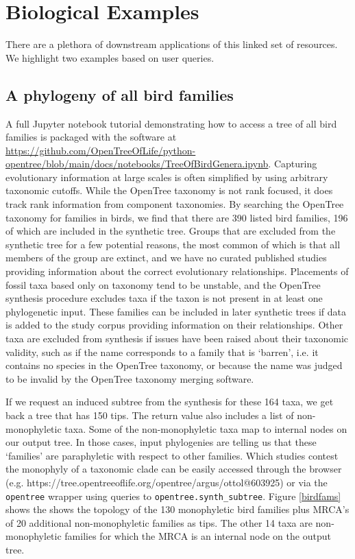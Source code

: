 \documentclass[oupdraft]{sysbio_sse}
\begin{document}
\bigskip

\section{Biological Examples}
\label{sec4}

There are a plethora of downstream applications of this linked set of resources.
We highlight two examples based on user queries.


\subsection{A phylogeny of all bird families}
A full Jupyter notebook tutorial demonstrating how to access a tree of all bird families is packaged with the software at \url{https://github.com/OpenTreeOfLife/python-opentree/blob/main/docs/notebooks/TreeOfBirdGenera.ipynb}.
Capturing evolutionary information at large scales is often simplified by using arbitrary taxonomic cutoffs.
While the OpenTree taxonomy is not rank focused, it does track rank information from component taxonomies.
By searching the OpenTree taxonomy for families in birds, we find that there are 390 listed bird families, 196 of which are included in the synthetic tree.
Groups that are excluded from the synthetic tree for a few potential reasons, the most common of which is that all members of the group are extinct, and we have no curated published studies providing information about the correct evolutionary relationships.
Placements of fossil taxa based only on taxonomy tend to be unstable, and the OpenTree synthesis procedure excludes taxa if the taxon is not present in at least one  phylogenetic input.
These families can be included in later synthetic trees if data is added to the study corpus providing information on their relationships.
Other taxa are excluded from synthesis if issues have been raised about their taxonomic validity, such as if the name corresponds to a family that is `barren', i.e. it contains no species in the OpenTree taxonomy, or because the name was judged to be invalid by the OpenTree taxonomy merging software\citep{rees_automated_2017}.

If we request an induced subtree from the synthesis for these 164 taxa, we get back a tree that has 150 tips. The return value also includes a list of non-monophyletic taxa.
Some of the non-monophyletic taxa map to internal nodes on our output tree. In those cases, input phylogenies are telling us that these `families' are paraphyletic with respect to other families. Which studies contest the monophyly of a taxonomic clade can be easily accessed through the browser (e.g. https://tree.opentreeoflife.org/opentree/argus/ottol@603925) or via the \texttt{opentree} wrapper using queries to \texttt{opentree.synth\_subtree}. Figure \ref{birdfams} shows the shows the topology of the 130 monophyletic bird families plus MRCA's of 20 additional non-monophyletic families as tips. The other 14 taxa are non-monophyletic families for which the MRCA is an internal node on the output tree.
\end{document}
